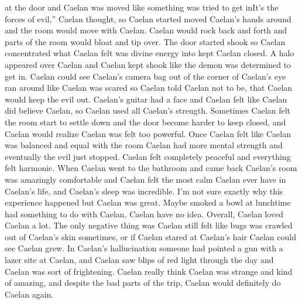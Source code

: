 \documentclass[12pt]{book}
\begin{document}
at the door and Caelan was moved like something was tried to get inIt's the forces of evil,'' Caelan thought, so Caelan started moved Caelan's hands around and the room would move with Caelan. Caelan would rock back and forth and parts of the room would bloat and tip over. The door started shook so Caelan concentrated what Caelan felt was divine energy into kept Caelan closed. A halo appeared over Caelan and Caelan kept shook like the demon was determined to get in. Caelan could see Caelan's camera bag out of the corner of Caelan's eye ran around like Caelan was scared so Caelan told Caelan not to be, that Caelan would keep the evil out. Caelan's guitar had a face and Caelan felt like Caelan did believe Caelan, so Caelan used all Caelan's strength. Sometimes Caelan felt the room start to settle down and the door become harder to keep closed, and Caelan would realize Caelan was felt too powerful. Once Caelan felt like Caelan was balanced and equal with the room Caelan had more mental strength and eventually the evil just stopped. Caelan felt completely peaceful and everything felt harmonic. When Caelan went to the bathroom and came back Caelan's room was amazingly comfortable and Caelan felt the most calm Caelan ever have in Caelan's life, and Caelan's sleep was incredible. I'm not sure exactly why this experience happened but Caelan was great. Maybe smoked a bowl at lunchtime had something to do with Caelan, Caelan have no idea. Overall, Caelan loved Caelan a lot. The only negative thing was Caelan still felt like bugs was crawled out of Caelan's skin sometimes, or if Caelan stared at Caelan's hair Caelan could see Caelan grew. In Caelan's hallucination someone had pointed a gun with a lazer site at Caelan, and Caelan saw blips of red light through the day and Caelan was sort of frightening. Caelan really think Caelan was strange and kind of amazing, and despite the bad parts of the trip, Caelan would definitely do Caelan again.
\end{document}
